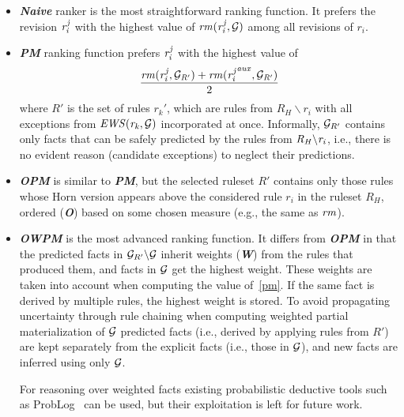 \begin{itemize}
    \item {\textbf{\em Naive}} ranker is the most straightforward ranking function. It prefers the revision $\mathit{r^j_i}$ with the highest value of $\mathit{rm(r^j_{i},\mathcal{G})}$ among all revisions of $r_i$.
    \item {\textbf{\em PM}} ranking function prefers $\mathit{r^j_i}$ with the highest value of
\begin{equation}
\label{pm}
\dfrac{\mathit{rm(r^j_i,\mathcal{G}_{R'})+rm({r^j_i}^{aux},\mathcal{G}_{R'})}}{2}
\end{equation}
 where $R'$ is the set of rules $r_k'$, which are rules from $R_H\backslash r_i$ with all exceptions from $\mathit{EWS(r_k,\mathcal{G})}$ incorporated at once. Informally, $\mathcal{G}_{R'}$ contains only facts that can be safely predicted by the rules from $\mathit{R_H\backslash r_i}$, i.e., there is no evident reason (candidate exceptions) to neglect their predictions.
    \item {\textbf{\em OPM}} is similar to \textbf{{\em PM}}, but the selected ruleset $R'$ contains only those rules whose Horn version appears above the considered rule $r_i$ in the ruleset $R_H$, ordered (\textbf{\em O}) based on some chosen measure (e.g., the same as $\mathit{rm}$). %
\smallskip

    \item {\textbf{\em OWPM}} is the most advanced ranking function. It differs from \textbf{\em OPM} in that the predicted facts in $\mathcal{G}_{R'}\backslash \mathcal{G}$ inherit weights (\textbf{\em W}) from the rules that produced them, and facts in $\mathcal{G}$ get the highest weight. These weights are taken into account when computing the value of~\ref{pm}. If the same fact is derived by multiple rules,  the highest weight is stored. To avoid propagating uncertainty through rule chaining when computing weighted partial materialization of $\mathcal{G}$ predicted facts (i.e., derived by applying rules from $R'$) are kept separately from the explicit facts (i.e., those in $\mathcal{G}$), and %
new facts are inferred using only $\mathcal{G}$.

For reasoning over weighted facts existing 
probabilistic deductive tools such as ProbLog~\cite{problog2007,problog2015} can be used, but their exploitation is left for future work.
\end{itemize}


